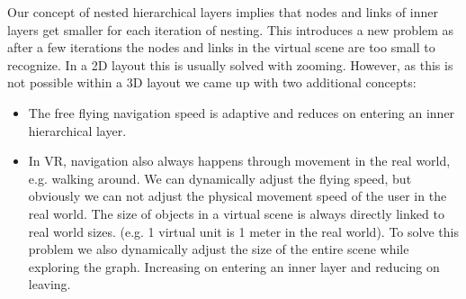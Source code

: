 Our concept of nested hierarchical layers implies that nodes and links of inner layers get smaller for each iteration of nesting. This introduces a new problem as after a few iterations the nodes and links in the virtual scene are too small to recognize. In a 2D layout this is usually solved with zooming. However, as this is not possible within a 3D layout we came up with two additional concepts: 
\begin{itemize}
    \item The free flying navigation speed is adaptive and reduces on entering an inner hierarchical layer.
    \item In VR, navigation also always happens through movement in the real world, e.g. walking around. We can dynamically adjust the flying speed, but obviously we can not adjust the physical movement speed of the user in the real world. The size of objects in a virtual scene is always directly linked to real world sizes. (e.g. 1 virtual unit is 1 meter in the real world). To solve this problem we also dynamically adjust the size of the entire scene while exploring the graph. Increasing on entering an inner layer and reducing on leaving. 
\end{itemize}


